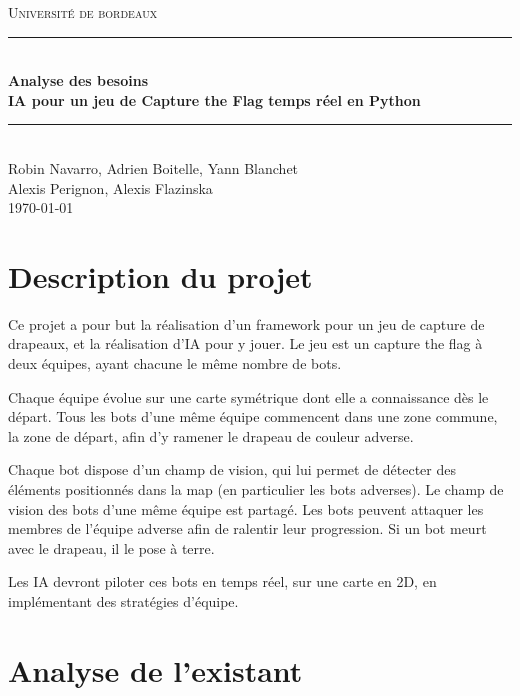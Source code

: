 \documentclass[french]{article}
\begin{document}
\begin{titlepage}
\newcommand{\HRule}{\rule{\linewidth}{0.5mm}}
\center
\textsc{\LARGE
Université de bordeaux
} \\[1cm]

\HRule \\[0.2cm]
{ \huge \bfseries Analyse des besoins \\[0.15cm] }
{ \bfseries IA pour un jeu de Capture the Flag temps réel en Python\\[0.15cm] }
\HRule \\[1.5cm]
Robin Navarro, Adrien Boitelle, Yann Blanchet\\Alexis Perignon, Alexis Flazinska
\\[1cm]
\today \\ [1cm]
\end{titlepage}

\newpage
\Large
\tableofcontents


\normalsize
\newpage
\section{Description du projet}

Ce projet a pour but la réalisation d'un framework pour un jeu de capture de drapeaux, et la réalisation d'IA pour y jouer.
Le jeu est un capture the flag à deux équipes, ayant chacune le même nombre de bots.
\newline

Chaque équipe évolue sur une carte symétrique dont elle a connaissance dès le départ. Tous les bots d'une même équipe commencent dans une zone commune, la zone de départ, afin d'y ramener le drapeau de couleur adverse.
\newline

Chaque bot dispose d'un champ de vision, qui lui permet de détecter des éléments positionnés dans la map (en particulier les bots adverses). Le champ de vision des bots d'une même équipe est partagé. Les bots peuvent attaquer les membres de l'équipe adverse afin de ralentir leur progression. Si un bot meurt avec le drapeau, il le pose à terre.
\newline

Les IA devront piloter ces bots en temps réel, sur une carte en 2D, en implémentant des stratégies d'équipe.


\section{Analyse de l'existant}
    
\end{document}
